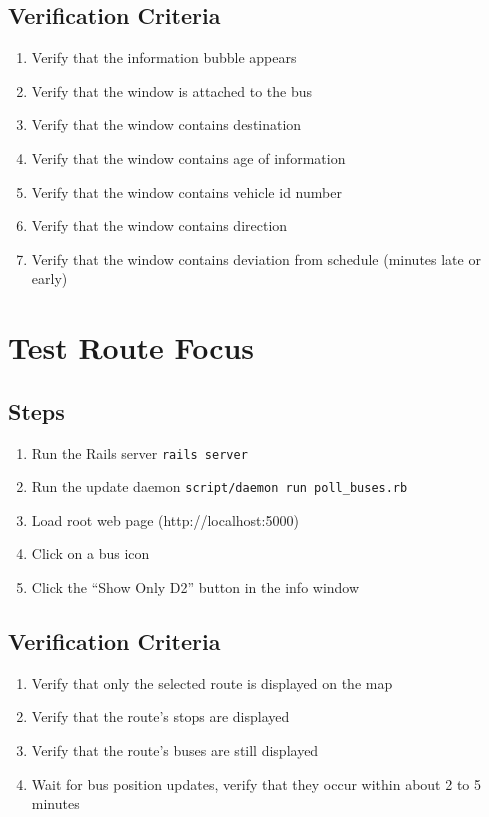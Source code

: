 \documentclass[12pt]{report}
\newcommand{\lstBash}{\lstinline[language=bash,breaklines=true]}
\begin{document}
\subsection*{Verification Criteria}
\begin{enumerate}
\item Verify that the information bubble appears 
\item Verify that the window is attached to the bus
\item Verify that the window contains destination
\item Verify that the window contains age of information
\item Verify that the window contains vehicle id number
\item Verify that the window contains direction
\item Verify that the window contains deviation from schedule (minutes late or early)
\end{enumerate}

\section{Test Route Focus}
\subsection*{Steps}
\begin{enumerate}
\item Run the Rails server \lstBash|rails server|
\item Run the update daemon \lstBash|script/daemon run poll_buses.rb|
\item Load root web page (http://localhost:5000)
\item Click on a bus icon
\item Click the ``Show Only D2'' button in the info window
\end{enumerate}
\subsection*{Verification Criteria}
\begin{enumerate}
\item Verify that only the selected route is displayed on the map
\item Verify that the route's stops are displayed
\item Verify that the route's buses are still displayed
\item Wait for bus position updates, verify that they occur within about 2 to 5 minutes
\end{enumerate}
\end{document}
